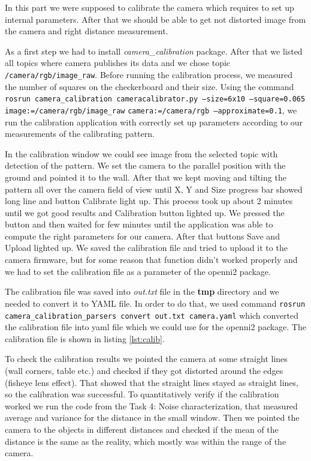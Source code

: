 \documentclass[11pt]{article}
\begin{document}
In this part we were supposed to calibrate the camera which requires to set up
internal parameters. After that we should be able to get not distorted image
from the camera and right distance measurement. \par

As a first step we had to install \emph{camera\_calibration} package. After that
we listed all topics where camera publishes its data and we chose topic
\texttt{/camera/rgb/image\_raw}. Before running the calibration process, we
measured the number of squares on the checkerboard and their size. Using the
command \texttt{rosrun camera\_calibration cameracalibrator.py --size=6x10
  --square=0.065 image:=/camera/rgb/image\_raw}{ } \texttt{camera:=/camera/rgb
  --approximate=0.1}, we run the calibration application with correctly set up
parameters according to our measurements of the calibrating pattern. \par

In the calibration window we could see image from the selected topic with
detection of the pattern. We set the camera to the parallel position with the
ground and pointed it to the wall. After that we kept moving and tilting the
pattern all over the camera field of view until X, Y and Size progress bar
showed long line and button Calibrate light up. This process took up about 2
minutes until we got good results and Calibration button lighted up. We pressed
the button and then waited for few minutes until the application was able to
compute the right parameters for our camera. After that buttons Save and Upload
lighted up. We saved the calibration file and tried to upload it to the camera
firmware, but for some reason that function didn't worked properly and we had to
set the calibration file as a parameter of the openni2 package. \par
        
The calibration file was saved into \emph{out.txt} file in the \textbf{tmp}
directory and we needed to convert it to YAML file. In order to do that, we used
command \texttt{rosrun camera\_calibration\_parsers convert out.txt camera.yaml}
which converted the calibration file into yaml file which we could use for the
openni2 package. The calibration file is shown in listing \vref{lst:calib}. \par
        
To check the calibration results we pointed the camera at some straight lines
(wall corners, table etc.) and checked if they got distorted around the
edges (fisheye lens effect). That showed that the straight lines stayed as 
straight lines, so the
calibration was successful. To quantitatively verify if the calibration worked
we run the code from the Task 4: Noise characterization, that measured average
and variance for the distance in the small window. Then we pointed the camera to
the objects in different distances and checked if the mean of the distance is
the same as the reality, which mostly was within the range of the camera. \par
\end{document}
